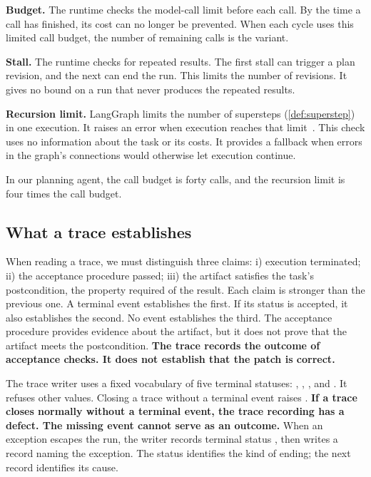 \bi

\item \textbf{Budget.} The runtime checks the model-call limit before each call. By the time a call
has finished, its cost can no longer be prevented. When each cycle uses this limited call budget,
the number of remaining calls is the variant.

\item \textbf{Stall.} The runtime checks for repeated results. The first stall can trigger a plan
revision, and the next can end the run. This limits the number of revisions. It gives no bound on
a run that never produces the repeated results.

\item \textbf{Recursion limit.} LangGraph limits the number of supersteps
(\cref{def:superstep}) in one execution. It raises an error when execution reaches that
limit~\citep{langgraph-graph-api}. This check uses no information about the task or its costs.
It provides a fallback when errors in the graph's connections would otherwise let execution continue.

\ei

\noindent In our planning agent, the call budget is forty calls, and the recursion limit is four times the
call budget.

\subsection{What a trace establishes}
\label{sec:control-termination}

When reading a trace, we must distinguish three claims: i) execution terminated; ii) the acceptance
procedure passed; iii) the artifact satisfies the task's postcondition, the property required of
the result. Each claim is stronger
than the previous one. A terminal event establishes the first. If its status is accepted, it also
establishes the second. No event establishes the third. The acceptance procedure provides evidence
about the artifact, but it does not prove that the artifact meets the postcondition.
\textbf{The trace records the outcome of acceptance checks. It does not establish that the patch
is correct.}

The trace writer uses a fixed vocabulary of five terminal statuses:
, , ,  and
. It refuses other values. Closing a trace without a terminal event raises
. \textbf{If a trace closes normally without a terminal event, the trace
recording has a defect. The missing event cannot serve as an outcome.} When an exception escapes
the run, the writer records terminal status , then writes a record naming the
exception. The status identifies the kind of ending; the next record identifies its cause.

